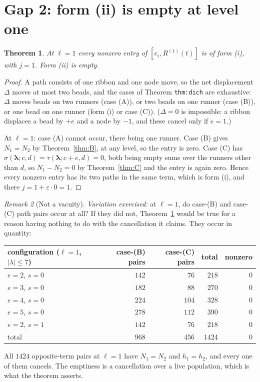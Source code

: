 \documentclass[11pt]{article}
\newtheorem{theorem}{Theorem}[section]
\theoremstyle{definition}
\theoremstyle{remark}
\newtheorem{remark}[theorem]{Remark}
\newcommand{\bl}{\boldsymbol{\lambda}}
\begin{document}
\section{Gap 2: form (ii) is empty at level one}\label{sec:gap2}

\begin{theorem}\label{thm:l1}
At $\ell=1$ every nonzero entry of $[e_i,R^{(1)}(t)]$ is of form (i), with $j=1$. Form
(ii) is empty.
\end{theorem}

\begin{proof}
A path consists of one ribbon and one node move, so the net displacement $\Delta$ moves
at most two beads, and the cases of Theorem \texttt{thm:dich} are exhaustive: $\Delta$
moves beads on two runners (case (A)), or two beads on one runner (case (B)), or one bead
on one runner (form (i) or case (C)). ($\Delta=0$ is impossible: a ribbon displaces a bead
by $+e$ and a node by $-1$, and these cancel only if $e=1$.)

At $\ell=1$: case (A) cannot occur, there being one runner. Case (B) gives $N_1=N_2$ by
Theorem~\ref{thm:B}, at any level, so the entry is zero. Case (C) has
$\sigma(\bl;c,d)=\tau(\bl;c+e,d)=0$, both being empty sums over the runners other than
$d$, so $N_1-N_2=0$ by Theorem~\ref{thm:C} and the entry is again zero. Hence every
nonzero entry has its two paths in the same term, which is form (i), and there
$j=1+\varepsilon\cdot0=1$.
\end{proof}

\begin{remark}[Not a vacuity]
\emph{Variation exercised:} at $\ell=1$, do case-(B) and case-(C) path pairs occur at
all? If they did not, Theorem~\ref{thm:l1} would be true for a reason having nothing to
do with the cancellation it claims. They occur in quantity:
\begin{center}
\begin{tabular}{lrrrr}
\hline
configuration ($\ell=1$, $|\lambda|\le7$) & case-(B) pairs & case-(C) pairs & total & nonzero\\
\hline
$e=2$, $s=0$ & $142$ & $76$ & $218$ & $0$\\
$e=3$, $s=0$ & $182$ & $88$ & $270$ & $0$\\
$e=4$, $s=0$ & $224$ & $104$ & $328$ & $0$\\
$e=5$, $s=0$ & $278$ & $112$ & $390$ & $0$\\
$e=2$, $s=1$ & $142$ & $76$ & $218$ & $0$\\
\hline
total & $968$ & $456$ & $1424$ & $0$\\
\hline
\end{tabular}
\end{center}
All $1424$ opposite-term pairs at $\ell=1$ have $N_1=N_2$ and $h_1=h_2$, and every one of
them cancels. The emptiness is a cancellation over a live population, which is what the
theorem asserts.
\end{remark}
\end{document}
